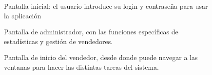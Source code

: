 \documentclass[12pt,a4paper,titlepage]{article}
\begin{document}
\begin{figure}[hbtp]   
	\begin{center} 
		\caption{Pantalla inicial: el usuario introduce su login y contraseña para usar la aplicación} 
	\end{center}  
\end{figure}
		
\begin{figure}[hbtp]   
	\begin{center} 
		\caption{Pantalla de administrador, con las funciones específicas de estadísticas y gestión de vendedores.} 
	\end{center}  
\end{figure}

\begin{figure}[hbtp]   
	\begin{center} 
		\caption{Pantalla de inicio del vendedor, desde donde puede navegar a las ventanas para hacer las distintas tareas del sistema.} 
	\end{center}  
\end{figure}
\end{document}
